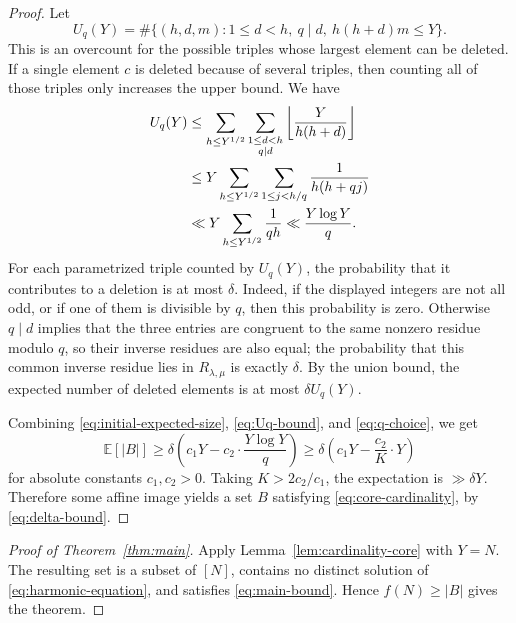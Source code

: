 \documentclass[11pt]{article}
\theoremstyle{plain}
\theoremstyle{remark}
\begin{document}
\begin{proof}
Let
\[
  U_q(Y)=
  \#\{(h,d,m):1\le d<h,\ q\mid d,\ h(h+d)m\le Y\}.
\]
This is an overcount for the possible triples whose largest element can be deleted.  If a single element $c$ is deleted because of several triples, then counting all of those triples only increases the upper bound.  We have
\begin{align}
  U_q(Y)
  &\le
  \sum_{h\le Y^{1/2}}
  \sum_{\substack{1\le d<h\\ q\mid d}}
  \left\lfloor \frac{Y}{h(h+d)}\right\rfloor \notag\\
  &\le
  Y\sum_{h\le Y^{1/2}}
  \sum_{1\le j<h/q}
  \frac1{h(h+qj)} \notag\\
  &\ll
  Y\sum_{h\le Y^{1/2}}\frac1{qh}
  \ll \frac{Y\log Y}{q}.\label{eq:Uq-bound}
\end{align}
For each parametrized triple counted by $U_q(Y)$, the probability that it contributes to a deletion is at most $\delta$.  Indeed, if the displayed integers are not all odd, or if one of them is divisible by $q$, then this probability is zero.  Otherwise $q\mid d$ implies that the three entries are congruent to the same nonzero residue modulo $q$, so their inverse residues are also equal; the probability that this common inverse residue lies in $R_{\lambda,\mu}$ is exactly $\delta$.  By the union bound, the expected number of deleted elements is at most $\delta U_q(Y)$.

Combining \eqref{eq:initial-expected-size}, \eqref{eq:Uq-bound}, and \eqref{eq:q-choice}, we get
\[
  \mathbb E\!\left[|B|\right]
  \ge
  \delta\left(c_1Y-c_2\cdot\frac{Y\log Y}{q}\right)
  \ge
  \delta\left(c_1Y-\frac{c_2}{K}\cdot Y\right)
\]
for absolute constants $c_1,c_2>0$.  Taking $K>2c_2/c_1$, the expectation is $\gg \delta Y$.  Therefore some affine image yields a set $B$ satisfying \eqref{eq:core-cardinality}, by \eqref{eq:delta-bound}.
\end{proof}

\begin{proof}[Proof of Theorem~\ref{thm:main}]
Apply Lemma~\ref{lem:cardinality-core} with $Y=N$.  The resulting set is a subset of $[N]$, contains no distinct solution of \eqref{eq:harmonic-equation}, and satisfies \eqref{eq:main-bound}.  Hence $f(N)\ge |B|$ gives the theorem.
\end{proof}
\end{document}
